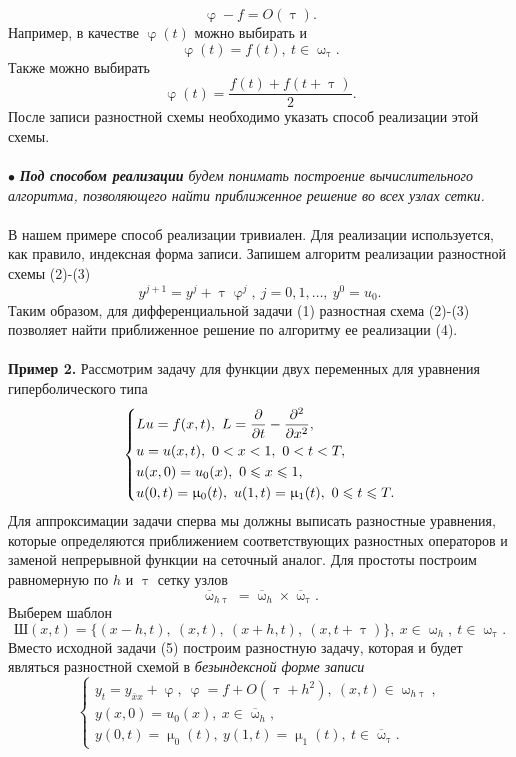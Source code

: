 \documentclass[a4paper, 12pt]{report}
\numberwithin{equation}{section}
\newcommand{\ol}{\overline}
\renewcommand{\leq}{\leqslant}
\renewcommand{\varphi}{\upvarphi}
\renewcommand{\tau}{\uptau}
\renewcommand{\mu}{\upmu}
\renewcommand{\omega}{\upomega}
\renewcommand{\d}{\partial}
\begin{document}
$$\varphi - f = O(\tau).$$
Например, в качестве $\varphi(t)$ можно выбирать и $$\varphi(t) = f(t),\ t \in \omega_{\tau}.$$ Также можно выбирать $$\varphi(t) = \dfrac{f(t) + f(t+\tau)}{2}.$$
После записи разностной схемы необходимо указать способ реализации этой схемы.\\\\ $\bullet$ \textit{\textbf{Под способом реализации} будем понимать построение вычислительного алгоритма, позволяющего найти приближенное решение во всех узлах сетки.}\\\\
В нашем примере способ реализации тривиален. Для реализации используется, как правило, индексная форма записи. Запишем алгоритм реализации разностной схемы (2)-(3)
\begin{equation}
y^{j+1}=y^j + \tau \varphi^j,\ j=0,1,\ldots,\ y^0 = u_0.
\end{equation}
Таким образом, для дифференциальной задачи (1) разностная схема (2)-(3) позволяет найти приближенное решение по алгоритму ее реализации (4).
\\\\
\textbf{Пример 2.}
Рассмотрим задачу для функции двух переменных для уравнения гиперболического типа
\begin{equation}
\begin{dcases}
	Lu = f(x,t), \ L = \dfrac{\d }{\d t} - \dfrac{\d ^2}{\d x^2},\\
u = u(x,t),\ 0<x<1,\ 0<t<T,\\
u(x,0) = u_0(x), \ 0\leq x \leq 1,\\
u(0,t) = \mu_0(t),\ u(1,t) = \mu_1(t),\ 0\leq t\leq T.
\end{dcases}
\end{equation}
Для аппроксимации задачи сперва мы должны выписать разностные уравнения, которые определяются приближением соответствующих разностных операторов и заменой непрерывной функции на сеточный аналог. Для простоты построим равномерную по $h$ и $\tau$ сетку узлов
$$\ol \omega_{h\tau} = \ol \omega_h \times \ol \omega_\tau.$$
Выберем шаблон
$$\text{Ш}(x,t) = \{(x-h, t),\ (x,t),\ (x+h,t),\ (x,t+\tau)\},\ x\in \omega_h,\ t \in \omega_\tau.$$
Вместо исходной задачи (5) построим разностную задачу, которая и будет являться разностной схемой в \textit{безындексной форме записи}
\begin{equation}
\begin{cases}
	y_t = y_{\ol x x} + \varphi,\ \varphi = f+O(\tau + h^2),\ (x,t)\in \omega_{h\tau},\\
y(x,0) = u_0(x),\ x\in \ol \omega_h,\\
y(0, t) = \mu_0(t),\ y(1,t) = \mu_1(t),\ t\in \ol\omega_\tau.
\end{cases}
\end{equation}
\end{document}
